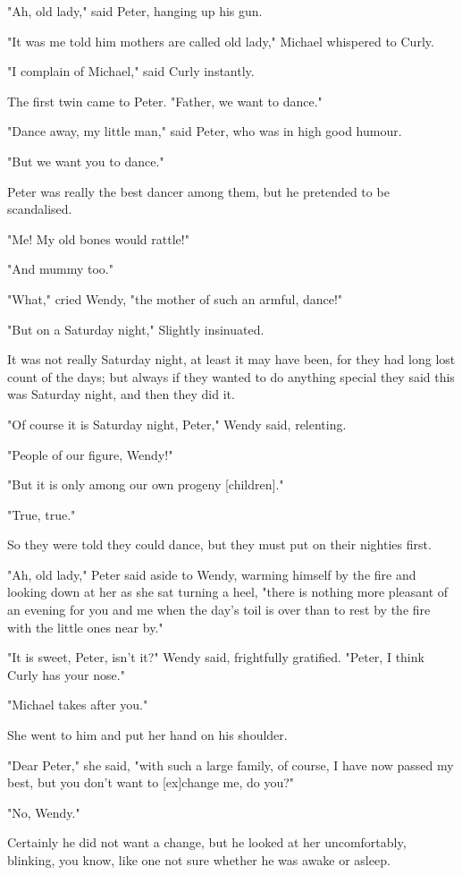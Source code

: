 "Ah, old lady," said Peter, hanging up his gun.


"It was me told him mothers are called old lady," Michael whispered to
Curly.


"I complain of Michael," said Curly instantly.


The first twin came to Peter. "Father, we want to dance."


"Dance away, my little man," said Peter, who was in high good humour.


"But we want you to dance."


Peter was really the best dancer among them, but he pretended to be
scandalised.


"Me! My old bones would rattle!"


"And mummy too."


"What," cried Wendy, "the mother of such an armful, dance!"


"But on a Saturday night," Slightly insinuated.


It was not really Saturday night, at least it may have been, for they had
long lost count of the days; but always if they wanted to do anything
special they said this was Saturday night, and then they did it.


"Of course it is Saturday night, Peter," Wendy said, relenting.


"People of our figure, Wendy!"


"But it is only among our own progeny [children]."


"True, true."


So they were told they could dance, but they must put on their nighties
first.


"Ah, old lady," Peter said aside to Wendy, warming himself by the fire and
looking down at her as she sat turning a heel, "there is nothing more
pleasant of an evening for you and me when the day's toil is over than to
rest by the fire with the little ones near by."


"It is sweet, Peter, isn't it?" Wendy said, frightfully gratified. "Peter,
I think Curly has your nose."


"Michael takes after you."


She went to him and put her hand on his shoulder.


"Dear Peter," she said, "with such a large family, of course, I have now
passed my best, but you don't want to [ex]change me, do you?"


"No, Wendy."


Certainly he did not want a change, but he looked at her uncomfortably,
blinking, you know, like one not sure whether he was awake or asleep.


